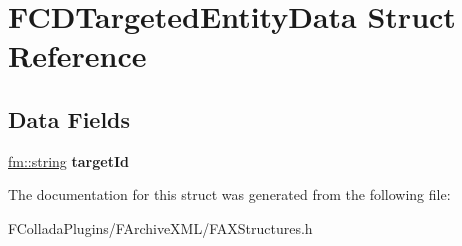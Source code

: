 \hypertarget{structFCDTargetedEntityData}{
\section{FCDTargetedEntityData Struct Reference}
\label{structFCDTargetedEntityData}
}
\subsection*{Data Fields}
\begin{DoxyCompactItemize}
\item 
\hypertarget{structFCDTargetedEntityData_ad64ad27c8cf8d397204f00e6bdd78179}{
\hyperlink{classfm_1_1stringT}{fm::string} {\bfseries targetId}}
\label{structFCDTargetedEntityData_ad64ad27c8cf8d397204f00e6bdd78179}

\end{DoxyCompactItemize}


The documentation for this struct was generated from the following file:\begin{DoxyCompactItemize}
\item 
FColladaPlugins/FArchiveXML/FAXStructures.h\end{DoxyCompactItemize}
